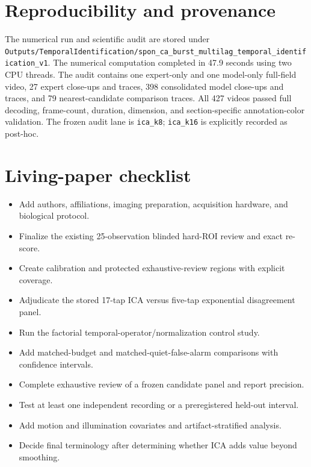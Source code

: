 \documentclass[11pt]{article}
\begin{document}
\section{Reproducibility and provenance}
The numerical run and scientific audit are stored under
\texttt{Outputs/TemporalIdentification/spon\_ca\_burst\_multilag\_temporal\_identification\_v1}.
The numerical computation completed in 47.9 seconds using two CPU threads. The audit contains one expert-only and one model-only full-field video, 27 expert close-ups and traces, 398 consolidated model close-ups and traces, and 79 nearest-candidate comparison traces. All 427 videos passed full decoding, frame-count, duration, dimension, and section-specific annotation-color validation. The frozen audit lane is \texttt{ica\_k8}; \texttt{ica\_k16} is explicitly recorded as post-hoc.

\section{Living-paper checklist}
\begin{itemize}
\item[$\square$] Add authors, affiliations, imaging preparation, acquisition hardware, and biological protocol.
\item[$\square$] Finalize the existing 25-observation blinded hard-ROI review and exact re-score.
\item[$\square$] Create calibration and protected exhaustive-review regions with explicit coverage.
\item[$\square$] Adjudicate the stored 17-tap ICA versus five-tap exponential disagreement panel.
\item[$\square$] Run the factorial temporal-operator/normalization control study.
\item[$\square$] Add matched-budget and matched-quiet-false-alarm comparisons with confidence intervals.
\item[$\square$] Complete exhaustive review of a frozen candidate panel and report precision.
\item[$\square$] Test at least one independent recording or a preregistered held-out interval.
\item[$\square$] Add motion and illumination covariates and artifact-stratified analysis.
\item[$\square$] Decide final terminology after determining whether ICA adds value beyond smoothing.
\end{itemize}
\end{document}
